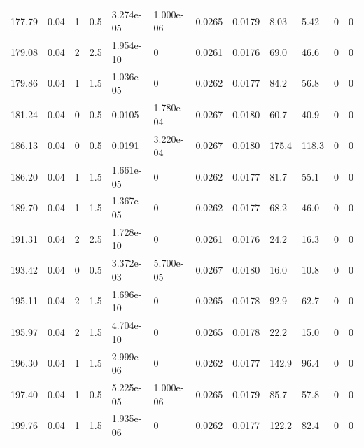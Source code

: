 \documentclass[preview]{standalone}
\begin{document}
{{{\begin{tabular}{L{1.2cm}C{1.2cm} C{0.3cm}C{0.5cm} C{1.4cm}C{1.4cm} C{1.4cm}C{1.4cm} C{1.6cm}C{1.6cm} C{1.6cm}C{1.6cm}}
  177.79  &  0.04  & 1     & 0.5 &  3.274e-05  & 1.000e-06  &  0.0265&   0.0179& 8.03 & 5.42   &  0 & 0  \\ 
  179.08  &  0.04  & 2     & 2.5 &  1.954e-10  & 0  &  0.0261&   0.0176& 69.0 & 46.6   &  0 & 0  \\ 
  179.86  &  0.04  & 1     & 1.5 &  1.036e-05  & 0  &  0.0262&   0.0177& 84.2 & 56.8   &  0 & 0  \\ 
  181.24  &  0.04  & 0     & 0.5 &  0.0105  & 1.780e-04  &  0.0267&   0.0180& 60.7 & 40.9   &  0 & 0  \\ 
  186.13  &  0.04  & 0     & 0.5 &  0.0191  & 3.220e-04  &  0.0267&   0.0180& 175.4 & 118.3   &  0 & 0  \\ 
  186.20  &  0.04  & 1     & 1.5 &  1.661e-05  & 0  &  0.0262&   0.0177& 81.7 & 55.1   &  0 & 0  \\ 
  189.70  &  0.04  & 1     & 1.5 &  1.367e-05  & 0  &  0.0262&   0.0177& 68.2 & 46.0   &  0 & 0  \\ 
  191.31  &  0.04  & 2     & 2.5 &  1.728e-10  & 0  &  0.0261&   0.0176& 24.2 & 16.3   &  0 & 0  \\ 
  193.42  &  0.04  & 0     & 0.5 &  3.372e-03  & 5.700e-05  &  0.0267&   0.0180& 16.0 & 10.8   &  0 & 0  \\ 
  195.11  &  0.04  & 2     & 1.5 &  1.696e-10  & 0  &  0.0265&   0.0178& 92.9 & 62.7   &  0 & 0  \\ 
  195.97  &  0.04  & 2     & 1.5 &  4.704e-10  & 0  &  0.0265&   0.0178& 22.2 & 15.0   &  0 & 0  \\ 
  196.30  &  0.04  & 1     & 1.5 &  2.999e-06  & 0  &  0.0262&   0.0177& 142.9 & 96.4   &  0 & 0  \\ 
  197.40  &  0.04  & 1     & 0.5 &  5.225e-05  & 1.000e-06  &  0.0265&   0.0179& 85.7 & 57.8   &  0 & 0  \\ 
  199.76  &  0.04  & 1     & 1.5 &  1.935e-06  & 0  &  0.0262&   0.0177& 122.2 & 82.4   &  0 & 0  \\ 
\hline 
\end{tabular} 

}}}
\end{document}
